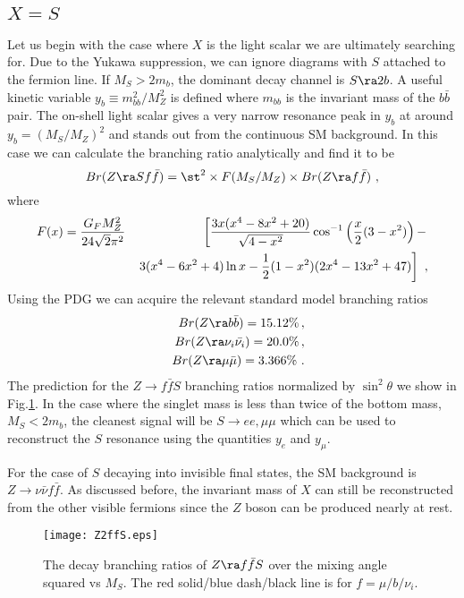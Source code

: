 \documentclass[11pt]{article}
\begin{document}
\subsection{$X=S$}
Let us begin with the case where $X$ is the light scalar we are ultimately searching for.
Due to the Yukawa suppression, we can ignore diagrams with $S$ attached to the fermion line.
If $M_S>2m_b$, the dominant decay channel is $S\ra 2b$.
A useful kinetic variable $y_b\equiv m^2_{bb}/M_Z^2$  is defined where $m_{bb}$ is the invariant mass of the $b\bar{b}$ pair.
The on-shell light scalar gives a very narrow resonance peak in $y_b$ at around $y_b=(M_S/M_Z)^2$ and stands out from the continuous SM background.
In this case we can calculate the branching ratio analytically and find it to be
\begin{equation}
Br(Z\ra S f\bar{f})= \st^2 \times F(M_S/M_Z) \times Br(Z\ra f\bar{f})\  ,
\end{equation}
where
\begin{eqnarray}
F(x)=\frac{G_F M_Z^2 }{24\sqrt{2} \pi^2 }
&& \left[ {3 x (x^4-8x^2+20)\over \sqrt{4-x^2}}\cos^{-1}\left( \frac{x}{2}(3-x^2)\right) - \right.\nonumber \\
&& \left. 3(x^4-6x^2+4)\ln x-\frac{1}{2}(1-x^2)(2x^4-13x^2+47) \right]\ ,
\end{eqnarray}
Using the PDG\cite{Patrignani:2016xqp} we can acquire the relevant standard model branching ratios \begin{eqnarray}
&& Br(Z\ra b\bar{b})=15.12\%\,, \nonumber \\
&& Br(Z\ra \nu_i\bar{\nu_i})=20.0\%\,, \nonumber \\
&& Br(Z\ra \mu\bar{\mu})=3.366\% \ .
\end{eqnarray} The prediction for the $Z\to f\bar{f}S$ branching ratios normalized by $\sin ^2 \theta $ we show in  Fig.\ref{fig:Z2Sff}.
In the case where the singlet mass is less than twice of the bottom mass, $M_S<2 m_b$, the cleanest signal will be $S \to ee, \mu\mu$ which can be used to reconstruct the $S$ resonance using the quantities $y_e$ and  $y_\mu$. \par
For the case of $S$  decaying into invisible final states, the SM background is $Z\to \nu\bar{\nu} f\bar{f}$. As discussed before, the invariant mass of $X$ can still be reconstructed from the other visible fermions since the $Z$ boson can be produced nearly at rest.
\begin{figure}
    \centering
    \texttt{[image: Z2ffS.eps]}%
    \caption{The decay branching ratios of $Z\ra f\bar{f} S$ over the mixing angle squared vs $M_S$.
    The red solid/blue dash/black line is for $f=\mu /b/\nu_i$. }
    \label{fig:Z2Sff}
\end{figure}
\end{document}
